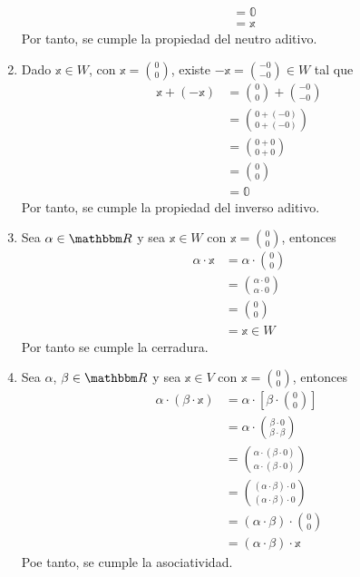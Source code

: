 \begin{example}
\begin{enumerate}[label=\roman*)]
\begin{align*}
            & = \mathbb{0} \\
            & = \mathbb{x}
        \end{align*}
        Por tanto, se cumple la propiedad del neutro aditivo.
        \item Dado $\mathbb{x} \in W$, con $\displaystyle \mathbb{x} = \binom{0}{0}$, existe $\displaystyle -\mathbb{x} = \binom{-0}{-0} \in W$ tal que
        \begin{align*}
            \mathbb{x} + (-\mathbb{x}) & = \binom{0}{0} + \binom{-0}{-0} \\
            & = \binom{0+(-0)}{0+(-0)} \\
            & = \binom{0+0}{0+0} \\
            & = \binom{0}{0} \\
            & = \mathbb{0}
        \end{align*}
        Por tanto, se cumple la propiedad del inverso aditivo.
        \item Sea $\alpha \in \RR$ y sea $\mathbb{x} \in W$ con $\displaystyle \mathbb{x} = \binom{0}{0}$, entonces
        \begin{align*}
            \alpha \cdot \mathbb{x} & = \alpha \cdot \binom{0}{0} \\
            & = \binom{\alpha \cdot 0}{\alpha \cdot 0} \\
            & = \binom{0}{0} \\
            & = \mathbb{x} \in W
        \end{align*}
        Por tanto se cumple la cerradura.
        \item Sea $\alpha$, $\beta \in \RR$ y sea $\mathbb{x} \in V$ con $\displaystyle \mathbb{x} = \binom{0}{0}$, entonces
        \begin{align*}
            \alpha \cdot (\beta \cdot \mathbb{x}) & = \alpha \cdot \left[ \beta \cdot \binom{0}{0} \right] \\
            & = \alpha \cdot \binom{\beta \cdot 0}{\beta \cdot \beta} \\
            & = \binom{\alpha \cdot (\beta \cdot 0)}{\alpha \cdot (\beta \cdot 0)} \\
            & = \binom{(\alpha \cdot \beta) \cdot 0}{(\alpha \cdot \beta) \cdot 0} \\
            & = (\alpha \cdot \beta) \cdot \binom{0}{0} \\
            & = (\alpha \cdot \beta) \cdot \mathbb{x}
        \end{align*}
        Poe tanto, se cumple la asociatividad.

\end{enumerate}
\end{example}
